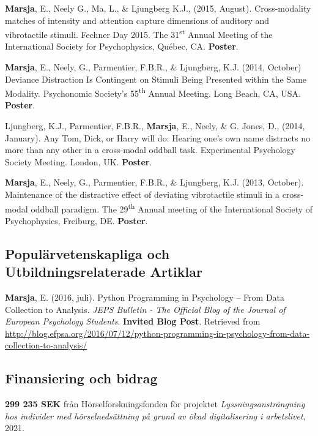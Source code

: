 \documentclass[]{article}
\begin{document}
\textbf{Marsja}, E., Neely G., Ma, L., \& Ljungberg K.J., (2015,
August). Cross-modality matches of intensity and attention capture
dimensions of auditory and vibrotactile stimuli. Fechner Day 2015. The
31\textsuperscript{st} Annual Meeting of the International Society for
Psychophysics, Québec, CA. \textbf{Poster}.

\textbf{Marsja}, E., Neely, G., Parmentier, F.B.R., \& Ljungberg, K.J.
(2014, October) Deviance Distraction Is Contingent on Stimuli Being
Presented within the Same Modality. Psychonomic Society's
55\textsuperscript{th} Annual Meeting. Long Beach, CA, USA.
\textbf{Poster}.

Ljungberg, K.J., Parmentier, F.B.R., \textbf{Marsja}, E., Neely, \& G.
Jones, D., (2014, January). Any Tom, Dick, or Harry will do: Hearing
one's own name distracts no more than any other in a cross-modal oddball
task. Experimental Psychology Society Meeting. London, UK.
\textbf{Poster}.

\textbf{Marsja}, E., Neely, G., Parmentier, F.B.R., \& Ljungberg, K.J.
(2013, October). Maintenance of the distractive effect of deviating
vibrotactile stimuli in a cross-modal oddball paradigm. The
29\textsuperscript{th} Annual meeting of the International Society of
Psychophysics, Freiburg, DE. \textbf{Poster}.

\hypertarget{populuxe4rvetenskapliga-och-utbildningsrelaterade-artiklar}{%
\subsection{Populärvetenskapliga och Utbildningsrelaterade
Artiklar}\label{populuxe4rvetenskapliga-och-utbildningsrelaterade-artiklar}}

\textbf{Marsja}, E. (2016, juli). Python Programming in Psychology --
From Data Collection to Analysis. \emph{JEPS Bulletin - The Official
Blog of the Journal of European Psychology Students}. \textbf{Invited
Blog Post}. Retrieved from \sloppy
\url{http://blog.efpsa.org/2016/07/12/python-programming-in-psychology-from-data-collection-to-analysis/}

\hypertarget{finansiering-och-bidrag}{%
\subsection{Finansiering och bidrag}\label{finansiering-och-bidrag}}

\textbf{299 235 SEK} från Hörselforskningsfonden för projektet
\emph{Lyssningsansträngning hos individer med hörselnedsättning på grund
av ökad digitalisering i arbetslivet}, 2021.
\end{document}
